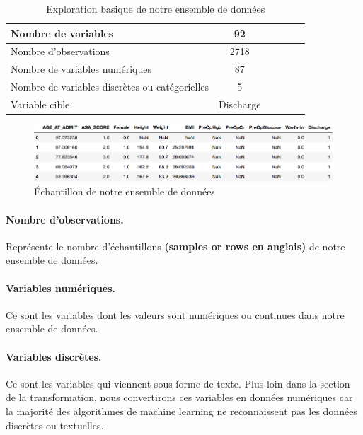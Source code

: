 \documentclass[12pt, french]{report}
\begin{document}
\begin{table}[h]
\centering
\begin{tabular}{|l|c|c|c|c|c|}
\hline
Nombre de variables & 92 \\
\hline
Nombre d'observations & 2718\\
\hline
Nombre de variables numériques & 87\\
\hline
Nombre de variables discrètes ou catégorielles & 5\\
\hline
Variable cible & Discharge\\
\hline

\end{tabular}
\caption{Exploration basique de notre ensemble de données}
\label{tab:dataset}
\end{table}

\begin{figure}[h]
	\begin{center}
		\includegraphics[width=18cm,angle=90]{images/examplesfeatures.png}
		\caption{Échantillon de notre ensemble de données}
		\label{fig:samplesdataset}
	\end{center}
\end{figure}


\paragraph*{Nombre d'observations.} Représente le nombre d'échantillons \textbf{(samples or rows en anglais)} de notre ensemble de données. 

\paragraph*{ Variables numériques.} Ce sont les variables dont les valeurs sont numériques ou continues dans notre ensemble de données.

\paragraph*{ Variables discrètes.} Ce sont les variables qui viennent sous forme de texte. Plus loin dans la section de la transformation, nous convertirons ces variables en données numériques car la majorité des algorithmes de machine learning ne reconnaissent pas les données discrètes ou textuelles.
\end{document}
